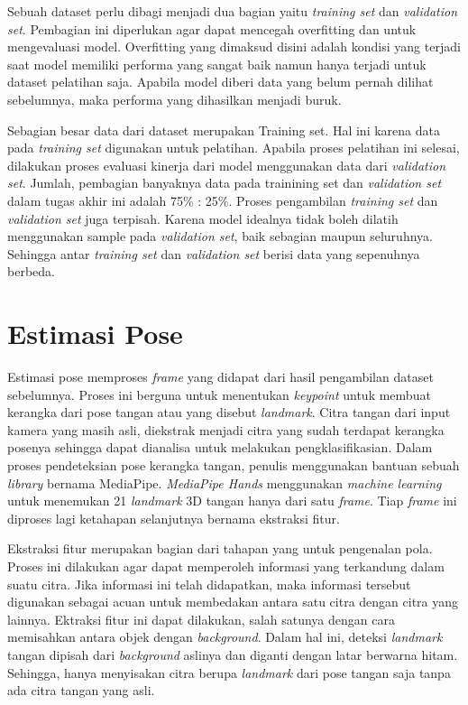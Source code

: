 Sebuah dataset perlu dibagi menjadi dua bagian yaitu \emph{training set} dan \emph{validation set}. Pembagian ini diperlukan agar dapat mencegah overfitting dan untuk mengevaluasi model. Overfitting yang dimaksud disini adalah kondisi yang terjadi saat model memiliki performa yang sangat baik namun hanya terjadi untuk dataset pelatihan saja. Apabila model diberi data yang belum pernah dilihat sebelumnya, maka performa yang dihasilkan menjadi buruk.

Sebagian besar data dari dataset merupakan Training set. Hal ini karena data pada \emph{training set} digunakan untuk pelatihan. Apabila proses pelatihan ini selesai, dilakukan proses evaluasi kinerja dari model menggunakan data dari \emph{validation set}. Jumlah, pembagian banyaknya data pada trainining set dan \emph{validation set} dalam tugas akhir ini adalah 75\% : 25\%. Proses pengambilan \emph{training set} dan \emph{validation set} juga terpisah. Karena model idealnya tidak boleh dilatih menggunakan sample pada \emph{validation set}, baik sebagian maupun seluruhnya. Sehingga antar \emph{training set} dan \emph{validation set} berisi data yang sepenuhnya berbeda. 

\section{Estimasi Pose}
\label{sec:poseprediction}

Estimasi pose memproses \emph{frame} yang didapat dari hasil pengambilan dataset sebelumnya. Proses ini berguna untuk menentukan \emph{keypoint} untuk membuat kerangka dari pose tangan atau yang disebut \emph{landmark}. Citra tangan dari input kamera yang masih asli, diekstrak menjadi citra yang sudah terdapat kerangka posenya sehingga dapat dianalisa untuk melakukan pengklasifikasian. Dalam proses pendeteksian pose kerangka tangan, penulis menggunakan bantuan sebuah \emph{library} bernama MediaPipe. \emph{MediaPipe Hands} menggunakan \emph{machine learning} untuk menemukan 21 \emph{landmark} 3D tangan hanya dari satu \emph{frame}. Tiap \emph{frame} ini diproses lagi ketahapan selanjutnya bernama ekstraksi fitur. 

Ekstraksi fitur merupakan bagian dari tahapan yang untuk pengenalan pola. Proses ini dilakukan agar dapat memperoleh informasi yang terkandung dalam suatu citra. Jika informasi ini telah didapatkan, maka informasi tersebut digunakan sebagai acuan untuk membedakan antara satu citra dengan citra yang lainnya. Ektraksi fitur ini dapat dilakukan, salah satunya dengan cara memisahkan antara objek dengan \emph{background}. Dalam hal ini, deteksi \emph{landmark} tangan dipisah dari \emph{background} aslinya dan diganti dengan latar berwarna hitam. Sehingga, hanya menyisakan citra berupa \emph{landmark} dari pose tangan saja tanpa ada citra tangan yang asli.   


